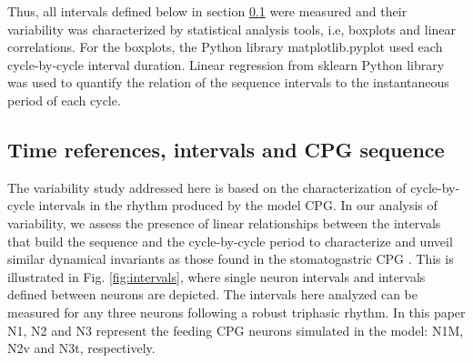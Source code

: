 Thus, all intervals defined below in section \ref{subsec:intervals} were measured and their variability was characterized by statistical analysis tools, i.e,  boxplots and linear correlations. For the boxplots, the Python library matplotlib.pyplot used each cycle-by-cycle interval duration. Linear regression from sklearn Python library was used to quantify the relation of the sequence intervals to the instantaneous period of each cycle. 

\subsection{Time references, intervals and CPG sequence}
\label{subsec:intervals}
The variability study addressed here is based on the characterization of  cycle-by-cycle intervals in the rhythm produced by the model CPG. %
In our analysis of variability, we assess the presence of linear relationships between the intervals that build the sequence and the cycle-by-cycle period to characterize and unveil similar dynamical invariants as those found in the stomatogastric CPG \cite{elices_robust_2019}. 
This is illustrated in Fig. \ref{fig:intervals}, where single neuron intervals and intervals defined between neurons are depicted. 
The intervals here analyzed can be measured for any three neurons following a robust triphasic rhythm. In this paper N1, N2 and N3 represent the feeding CPG neurons simulated in the model: N1M, N2v and N3t, respectively.

